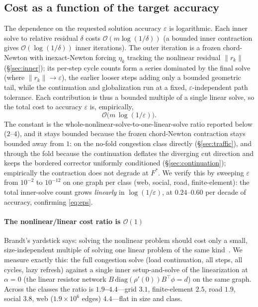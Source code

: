\documentclass{siamart220329}
\begin{document}
\subsection{Cost as a function of the target accuracy}\label{sec:accuracy}
The dependence on the requested solution accuracy $\varepsilon$ is logarithmic. Each inner solve to
relative residual $\delta$ costs $\mathcal{O}(m\log(1/\delta))$ (a bounded inner contraction gives
$\mathcal{O}(\log(1/\delta))$ inner iterations). The outer iteration is a frozen chord-Newton with
inexact-Newton forcing $\eta_k$ tracking the nonlinear residual $\|r_k\|$ (\S\ref{sec:inner}); its
per-step cycle counts form a series dominated by the final solve (where
$\|r_k\|\!\to\!\varepsilon$), the earlier looser steps adding only a bounded geometric tail, while the
continuation and globalization run at a fixed, $\varepsilon$-independent path tolerance. Each
contribution is thus a bounded multiple of a single linear solve, so the total cost to accuracy
$\varepsilon$ is, empirically,
\begin{equation}\label{eq:eps}
\mathcal{O}\!\big(m\,\log(1/\varepsilon)\big).
\end{equation}
The constant is the whole-nonlinear-solve-to-one-linear-solve ratio reported below ($2$--$4$), and it
stays bounded because the frozen chord-Newton contraction stays bounded away from $1$: on the no-fold
congestion class directly (\S\ref{sec:traffic}), and through the fold because the continuation
deflates the diverging cut direction and keeps the bordered corrector uniformly conditioned
(\S\ref{sec:continuation}); empirically the contraction does not degrade at $F^*$. We verify this by
sweeping $\varepsilon$ from $10^{-2}$ to $10^{-12}$ on one graph per class (web, social, road,
finite-element): the total inner-solve count grows \emph{linearly} in $\log(1/\varepsilon)$, at
$0.24$--$0.60$ per decade of accuracy, confirming \eqref{eq:eps}.

\paragraph{The nonlinear/linear cost ratio is $\mathcal{O}(1)$} Brandt's yardstick says: solving the nonlinear problem should cost only
a small, size-independent multiple of solving one linear problem of the same
kind~\cite[\S8.3]{brandt-guide}. We measure exactly this: the full congestion solve (load
continuation, all steps, all cycles, lazy refresh) against a single inner setup-and-solve of
the linearization at $\alpha=0$ (the linear resistor network $B\,\mathrm{diag}(\rho'(0))B^{\top}\phi=d$)
on the same graph. Across the classes the ratio is
\textbf{$1.9$--$4.4$}---grid $3.1$, finite-element $2.5$, road $1.9$, social $3.8$, web ($1.9\times10^6$
edges) $4.4$---flat in size and class.
\end{document}

